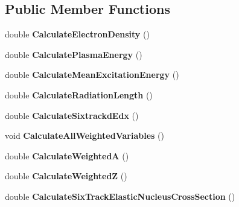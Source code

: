 \subsection*{Public Member Functions}
\begin{DoxyCompactItemize}
\item 
\mbox{\label{classCompositeMaterial_a5b8d5a91e5b4926ca42e54b4d9895fc3}} 
double {\bfseries Calculate\+Electron\+Density} ()
\item 
\mbox{\label{classCompositeMaterial_a17007f969cd002e14fb87d3a892fda72}} 
double {\bfseries Calculate\+Plasma\+Energy} ()
\item 
\mbox{\label{classCompositeMaterial_a4367abb1f10eb5697ccdd7a022f4101d}} 
double {\bfseries Calculate\+Mean\+Excitation\+Energy} ()
\item 
\mbox{\label{classCompositeMaterial_a14b99f32cf76e8b5866d050985d95bef}} 
double {\bfseries Calculate\+Radiation\+Length} ()
\item 
\mbox{\label{classCompositeMaterial_a734c1d5d8a442a6f681130ae982d206a}} 
double {\bfseries Calculate\+Sixtrackd\+Edx} ()
\item 
\mbox{\label{classCompositeMaterial_a57fb4ce9a7fffe98982f92e78e9de545}} 
void {\bfseries Calculate\+All\+Weighted\+Variables} ()
\item 
\mbox{\label{classCompositeMaterial_ac07365b00ab5ab5b6e35ad2ae93a7175}} 
double {\bfseries Calculate\+WeightedA} ()
\item 
\mbox{\label{classCompositeMaterial_abad95425de71a2faf22aa4ff37abadbb}} 
double {\bfseries Calculate\+WeightedZ} ()
\item 
\mbox{\label{classCompositeMaterial_a9e0af4666694ec0fb7d79e6561dc24da}} 
double {\bfseries Calculate\+Six\+Track\+Elastic\+Nucleus\+Cross\+Section} ()
\item 
\mbox{\label{classCompositeMaterial_a936bfee04c5da651bc94e13c0e3e9f4a}} 

\end{DoxyCompactItemize}
